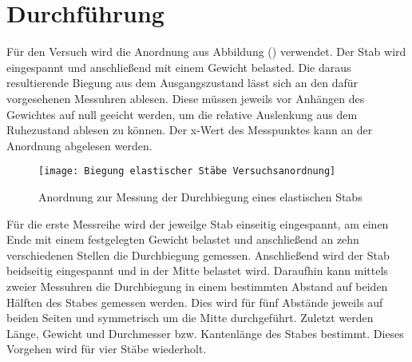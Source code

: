 \section{Durchführung}
Für den Versuch wird die Anordnung aus Abbildung () verwendet. Der Stab wird eingespannt und anschließend mit einem Gewicht belasted. Die daraus 
resultierende Biegung aus dem Ausgangszustand lässt sich an den dafür vorgesehenen Messuhren ablesen. Diese müssen jeweils vor Anhängen des Gewichtes 
auf null geeicht werden, um die relative Auslenkung aus dem Ruhezustand ablesen zu können. Der x-Wert des Messpunktes kann an der Anordnung abgelesen werden. \\
\begin{figure}
\centering
\texttt{[image: Biegung elastischer Stäbe Versuchsanordnung]}
\caption{Anordnung zur Messung der Durchbiegung eines elastischen Stabs}
\label{fig:Aufbau}
\end{figure}
Für die erste Messreihe wird der jeweilge Stab einseitig eingespannt, am einen Ende mit einem festgelegten Gewicht belastet und anschließend an zehn verschiedenen Stellen die Durchbiegung gemessen. Anschließend wird der Stab beidseitig eingespannt und in der Mitte belastet wird. Daraufhin kann mittels zweier Messuhren die Durchbiegung in einem bestimmten Abstand auf beiden Hälften des Stabes gemessen werden. Dies wird für fünf Abstände jeweils auf beiden Seiten und symmetrisch um die Mitte durchgeführt. Zuletzt werden Länge, Gewicht und Durchmesser bzw. Kantenlänge des Stabes bestimmt. Dieses Vorgehen wird für vier Stäbe wiederholt.
